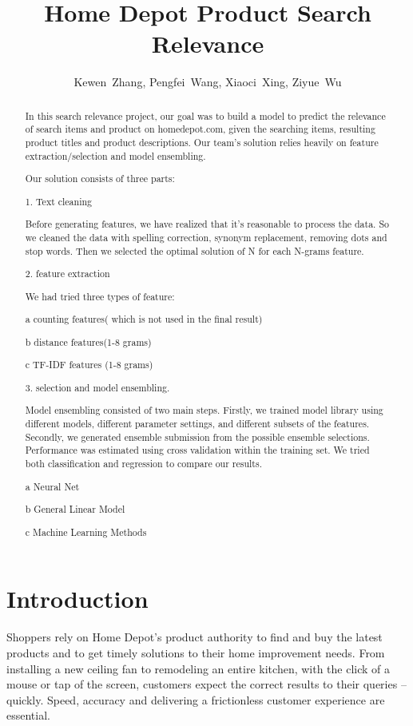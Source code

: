 \documentclass[journal]{IEEEtran}
\begin{document}
\title{Home Depot Product Search Relevance}


\author{Kewen~Zhang,
        Pengfei~Wang,
        Xiaoci~Xing,
        Ziyue~Wu}


\maketitle


\begin{abstract}
In this search relevance project, our goal was to build a model to predict the relevance of search items and product on homedepot.com, given the searching items, resulting product titles and product descriptions. Our team’s solution relies heavily on feature extraction/selection and model ensembling.

Our solution consists of three parts:

1. Text cleaning

Before generating features, we have realized that it’s reasonable to process the data. So we cleaned the data with spelling correction, synonym replacement, removing dots and stop words. Then we selected the optimal solution of N for each N-grams feature.

2. feature extraction

We had tried three types of feature:

a counting features( which is not used in the final result)

b distance features(1-8 grams)

c TF-IDF features (1-8 grams)

3. selection and model ensembling.

Model ensembling consisted of two main steps. Firstly, we trained model library using different models, different parameter settings, and different subsets of the features. Secondly, we generated ensemble submission from the possible ensemble selections. Performance was estimated using cross validation within the training set. We tried both classification and regression to compare our results.

a Neural Net

b General Linear Model

c Machine Learning Methods
\end{abstract}

\IEEEpeerreviewmaketitle



\section{Introduction}
Shoppers rely on Home Depot’s product authority to find and buy the latest products and to get timely solutions to their home improvement needs. From installing a new ceiling fan to remodeling an entire kitchen, with the click of a mouse or tap of the screen, customers expect the correct results to their queries – quickly. Speed, accuracy and delivering a frictionless customer experience are essential.
\end{document}
